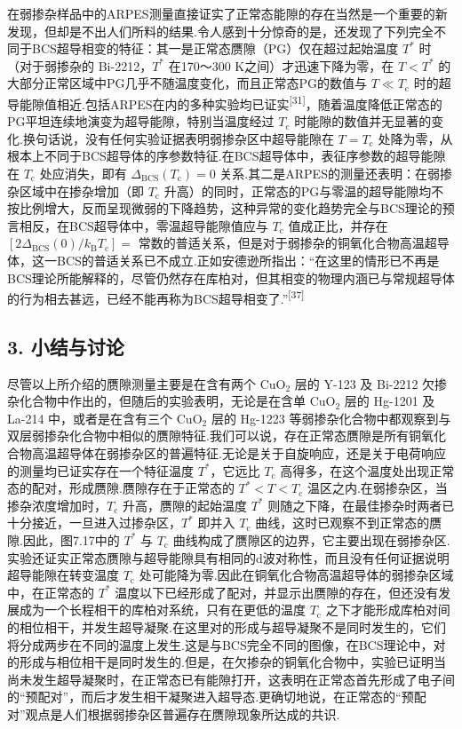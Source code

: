 在弱掺杂样品中的ARPES测量直接证实了正常态能隙的存在当然是一个重要的新发现，但却是不出人们所料的结果.令人感到十分惊奇的是，还发现了下列完全不同于BCS超导相变的特征：其一是正常态赝隙（PG）仅在超过起始温度 $T^{*}$ 时（对于弱掺杂的 Bi-2212，$T^{*}$ 在170～300 K之间）才迅速下降为零，在 $T<T^{*}$ 的大部分正常区域中PG几乎不随温度变化，而且正常态PG的数值与 $T\ll T_{\mathrm{c}}$ 时的超导能隙值相近.包括ARPES在内的多种实验均已证实\textsuperscript{[31]}，随着温度降低正常态的PG平坦连续地演变为超导能隙，特别当温度经过 $T_{\mathrm{c}}$ 时能隙的数值并无显著的变化.换句话说，没有任何实验证据表明弱掺杂区中超导能隙在 $T=T_{\mathrm{c}}$ 处降为零，从根本上不同于BCS超导体的序参数特征.在BCS超导体中，表征序参数的超导能隙在 $T_{\mathrm{c}}$ 处应消失，即有 $\Delta_{\mathrm{BCS}}\left(T_{\mathrm{c}}\right)=0$ 关系.其二是ARPES的测量还表明：在弱掺杂区域中在掺杂增加（即 $T_{\mathrm{c}}$ 升高）的同时，正常态的PG与零温的超导能隙均不按比例增大，反而呈现微弱的下降趋势，这种异常的变化趋势完全与BCS理论的预言相反，在BCS超导体中，零温超导能隙值应与 $T_{\mathrm{c}}$ 值成正比，并存在 $\left[2\Delta_{\mathrm{BCS}}(0)/k_{\mathrm{B}}T_{\mathrm{c}}\right]=$ 常数的普适关系，但是对于弱掺杂的铜氧化合物高温超导体，这一BCS的普适关系已不成立.正如安德逊所指出：“在这里的情形已不再是BCS理论所能解释的，尽管仍然存在库柏对，但其相变的物理内涵已与常规超导体的行为相去甚远，已经不能再称为BCS超导相变了.”\textsuperscript{[37]}

\subsection*{3. 小结与讨论}

尽管以上所介绍的赝隙测量主要是在含有两个 $\mathrm{CuO}_{2}$ 层的 Y-123 及 Bi-2212 欠掺杂化合物中作出的，但随后的实验表明，无论是在含单 $\mathrm{CuO}_{2}$ 层的 Hg-1201 及 La-214 中，或者是在含有三个 $\mathrm{CuO}_{2}$ 层的 Hg-1223 等弱掺杂化合物中都观察到与双层弱掺杂化合物中相似的赝隙特征.我们可以说，存在正常态赝隙是所有铜氧化合物高温超导体在弱掺杂区的普遍特征.无论是关于自旋响应，还是关于电荷响应的测量均已证实存在一个特征温度 $T^{*}$，它远比 $T_{\mathrm{c}}$ 高得多，在这个温度处出现正常态的配对，形成赝隙.赝隙存在于正常态的 $T^{*}<T<T_{\mathrm{c}}$ 温区之内.在弱掺杂区，当掺杂浓度增加时，$T_{\mathrm{c}}$ 升高，赝隙的起始温度 $T^{*}$ 则随之下降，在最佳掺杂时两者已十分接近，一旦进入过掺杂区，$T^{*}$ 即并入 $T_{\mathrm{c}}$ 曲线，这时已观察不到正常态的赝隙.因此，图7.17中的 $T^{*}$ 与 $T_{\mathrm{c}}$ 曲线构成了赝隙区的边界，它主要出现在弱掺杂区.实验还证实正常态赝隙与超导能隙具有相同的d波对称性，而且没有任何证据说明超导能隙在转变温度 $T_{\mathrm{c}}$ 处可能降为零.因此在铜氧化合物高温超导体的弱掺杂区域中，在正常态的 $T^{*}$ 温度以下已经形成了配对，并显示出赝隙的存在，但还没有发展成为一个长程相干的库柏对系统，只有在更低的温度 $T_{\mathrm{c}}$ 之下才能形成库柏对间的相位相干，并发生超导凝聚.在这里对的形成与超导凝聚不是同时发生的，它们将分成两步在不同的温度上发生.这是与BCS完全不同的图像，在BCS理论中，对的形成与相位相干是同时发生的.但是，在欠掺杂的铜氧化合物中，实验已证明当尚未发生超导凝聚时，在正常态已有能隙打开，这表明在正常态首先形成了电子间的“预配对”，而后才发生相干凝聚进入超导态.更确切地说，在正常态的“预配对”观点是人们根据弱掺杂区普遍存在赝隙现象所达成的共识.

